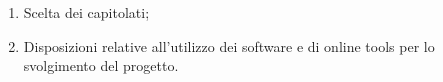\begin{enumerate}
    \item Scelta dei capitolati;
    \item Disposizioni relative all'utilizzo dei software e di online tools per lo svolgimento del progetto.
\end{enumerate}